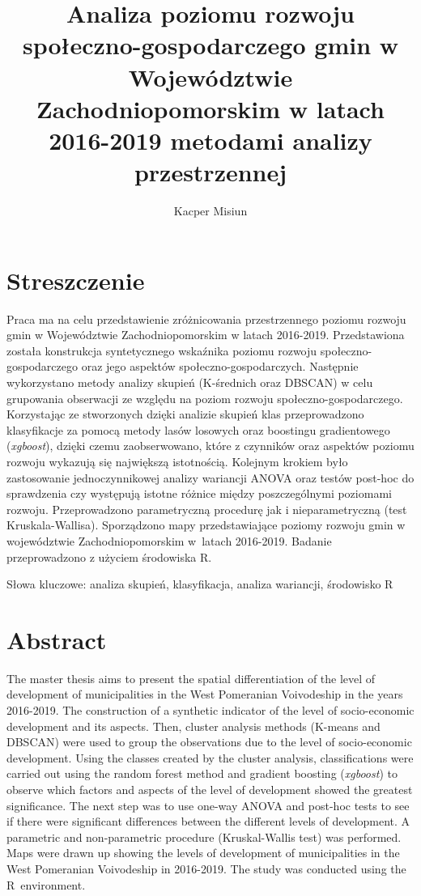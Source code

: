 \documentclass{amuthesis}
\author{Kacper Misiun}
\title{Analiza poziomu rozwoju społeczno-gospodarczego gmin w Województwie Zachodniopomorskim w latach 2016-2019 metodami analizy przestrzennej}
\begin{document}

\titlepage

\hypertarget{streszczenie}{%
\section*{Streszczenie}\label{streszczenie}}

\setlength\parindent{24pt}

Praca ma na celu przedstawienie zróżnicowania przestrzennego poziomu rozwoju gmin w Województwie Zachodniopomorskim w latach
2016-2019. Przedstawiona została konstrukcja syntetycznego wskaźnika poziomu rozwoju społeczno-gospodarczego oraz jego aspektów
społeczno-gospodarczych.
Następnie wykorzystano metody analizy skupień (K-średnich oraz DBSCAN) w celu grupowania obserwacji ze względu na poziom rozwoju społeczno-gospodarczego.
Korzystając ze stworzonych dzięki analizie skupień klas przeprowadzono klasyfikacje za pomocą metody lasów losowych oraz boostingu gradientowego (\emph{xgboost}), dzięki czemu zaobserwowano, które z czynników oraz aspektów poziomu rozwoju wykazują się największą istotnością.
Kolejnym krokiem było zastosowanie jednoczynnikowej analizy wariancji ANOVA oraz testów post-hoc do sprawdzenia czy występują istotne różnice między poszczególnymi poziomami rozwoju.
Przeprowadzono parametryczną procedurę jak i nieparametryczną (test Kruskala-Wallisa).
Sporządzono mapy przedstawiające poziomy rozwoju gmin w województwie Zachodniopomorskim w~latach 2016-2019.
Badanie przeprowadzono z użyciem środowiska R.

Słowa kluczowe: analiza skupień, klasyfikacja, analiza wariancji, środowisko R

\newpage

\hypertarget{abstract}{%
\section*{Abstract}\label{abstract}}

The master thesis aims to present the spatial differentiation of the level of development of municipalities in the West Pomeranian Voivodeship in the years 2016-2019.
The construction of a synthetic indicator of the level of socio-economic development and its aspects.
Then, cluster analysis methods (K-means and DBSCAN) were used to group the observations due to the level of socio-economic development.
Using the classes created by the cluster analysis, classifications were carried out using the random forest method and gradient boosting (\emph{xgboost}) to observe which factors and aspects of the level of development showed the greatest significance.
The next step was to use one-way ANOVA and post-hoc tests to see if there were significant differences between the different levels of development.
A parametric and non-parametric procedure (Kruskal-Wallis test) was performed.
Maps were drawn up showing the levels of development of municipalities in the West Pomeranian Voivodeship in 2016-2019.
The study was conducted using the R~environment.
\end{document}
